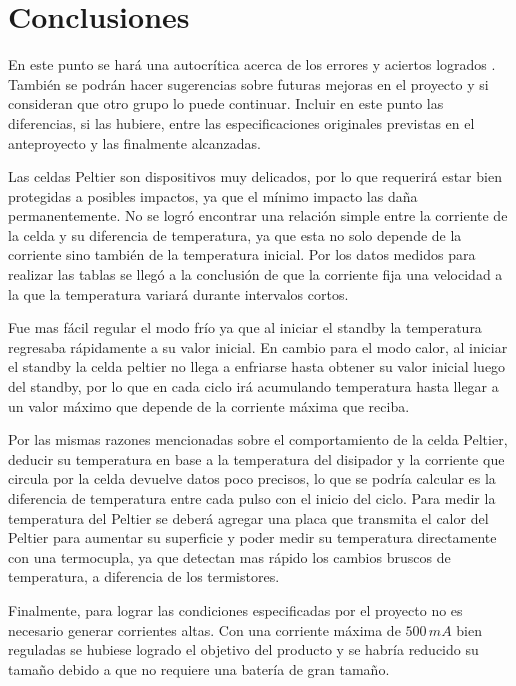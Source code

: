 \documentclass[10pt,spanish,a4paper,openany,notitlepage]{article}
\begin{document}
\section{Conclusiones}

En este punto se hará una autocrítica acerca de los errores y aciertos 
logrados . También se podrán  hacer sugerencias sobre futuras mejoras 
en el proyecto y si consideran que otro grupo lo puede continuar. Incluir 
en este punto las diferencias, si las hubiere, entre las especificaciones 
originales previstas en el anteproyecto y las finalmente alcanzadas.


Las celdas Peltier son dispositivos muy delicados, por lo que requerirá
estar bien protegidas a posibles impactos, ya que el mínimo impacto
las daña permanentemente. 
No se logró encontrar una relación simple entre la corriente de la celda
y su diferencia de temperatura, ya que esta no solo depende de la corriente
sino también de la temperatura inicial. Por los datos medidos para realizar
las tablas se llegó a la conclusión de que la corriente fija una velocidad
a la que la temperatura variará durante intervalos cortos.

Fue mas fácil regular el modo frío ya que al iniciar el standby la
temperatura regresaba rápidamente a su valor inicial. En cambio para el
modo calor, al iniciar el standby la celda peltier no llega a enfriarse
hasta obtener su valor inicial luego del standby, por lo que en cada ciclo
irá acumulando temperatura hasta llegar a un valor máximo que depende
de la corriente máxima que reciba.

Por las mismas razones mencionadas sobre el comportamiento de la celda Peltier,
deducir su temperatura en base a la temperatura del disipador y la corriente
que circula por la celda devuelve datos poco precisos, lo que se podría calcular
es la diferencia de temperatura entre cada pulso con el inicio del ciclo.
Para medir la temperatura del Peltier se deberá agregar una placa que
transmita el calor del Peltier para aumentar su superficie y poder medir su
temperatura directamente con una termocupla, ya que detectan mas rápido
los cambios bruscos de temperatura, a diferencia de los termistores. 


Finalmente, para lograr las condiciones especificadas por el proyecto
no es necesario generar corrientes altas. Con una corriente máxima de
$500\, \unit{mA}$ bien reguladas se hubiese logrado el objetivo del producto
y se habría reducido su tamaño debido a que no requiere una batería de
gran tamaño.
\end{document}

